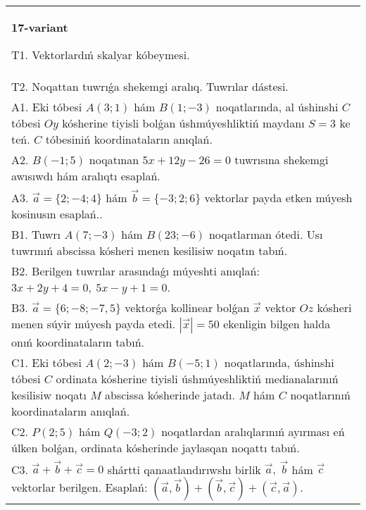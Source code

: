 \documentclass{article}
\begin{document}
\begin{tabular}{m{17cm}}
\textbf{17-variant}
\newline

T1. 
Vektorlardıń skalyar kóbeymesi.
 \\
T2. 
Noqattan tuwrıǵa shekemgi aralıq. Tuwrılar dástesi.
 \\
A1. 
Eki tóbesi $A(3;1)$ hám $B(1;-3)$ noqatlarında, al
úshinshi $C$ tóbesi $Oy$ kósherine tiyisli bolǵan úshmúyeshliktiń
maydanı $S=3$ ke teń. $C$ tóbesiniń koordinataların anıqlań.
 \\
A2. 
$B(-1;5)$ noqatınan $5x+12y-26=0$ tuwrısına 
shekemgi awısıwdı hám aralıqtı esaplań.
 \\
A3. 
$\overrightarrow{a} = \{ 2; - 4;4\}$ hám $\overrightarrow{b} = \{ - 3;2;6\}$
vektorlar payda etken múyesh kosinusın esaplań.. 
 \\
B1. 
Tuwrı \(A(7;-3)\) hám \(B(23;-6)\) noqatlarınan ótedi.
Usı tuwrınıń abscissa kósheri menen kesilisiw noqatın tabıń.
 \\
B2. 
Berilgen tuwrılar arasındaǵı múyeshti anıqlań: $3x+2y+4=0,\ 5x-y+1=0$.
 \\
B3. 
$\vec{a} = \{ 6; - 8; - 7,5\}$ vektorǵa kollinear bolǵan $\vec{x}$ vektor $Oz$ kósheri menen súyir múyesh payda etedi. $|\vec{x}| = 50$ ekenligin bilgen halda onıń koordinataların tabıń.
 \\
C1. 
Eki tóbesi \(A(2; - 3)\) hám \(B( - 5;1)\) noqatlarında,
úshinshi tóbesi $C$ ordinata kósherine tiyisli úshmúyeshliktiń
medianalarınıń kesilisiw noqatı $M$ abscissa kósherinde jatadı.
$M$ hám $C$ noqatlarınıń koordinataların anıqlań.
 \\
C2. 
\(P(2;5)\) hám \(Q( - 3;2)\) noqatlardan aralıqlarınıń
ayırması eń úlken bolǵan, ordinata kósherinde jaylasqan noqattı tabıń.
 \\
C3. \(\vec{a} + \vec{b} + \vec{c} = 0\) shártti qanaatlandırıwshı birlik \(\vec{a},\ \vec{b}\) hám \(\vec{c}\) vektorlar berilgen. Esaplań: \(\left(\vec{a},\vec{b} \right) + \left(\vec{b},\vec{c} \right) + \left(\vec{c},\vec{a} \right) \).
 \\

\end{tabular}
\vspace{1cm}
\end{document}
